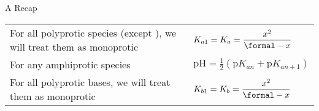 \documentclass[handout]{beamer}
\begin{document}

\begin{frame}{A Recap}
	\renewcommand\arraystretch{2}
	\begin{tabularx}{\linewidth} {@{}>{\raggedright\arraybackslash}X@{\qquad}l}
		For all polyprotic species (except \ch{H2SO4}), we will treat
		them as monoprotic & $K_{a1} = K_a =
		\dfrac{x^2}{\si{\formal}-x}$ \\
		For any amphiprotic species & $\text{pH} = \frac{1}{2}(\text{p}K_{an} +
		\text{p}K_{an+1})$\\
		For all polyprotic bases, we will treat them as monoprotic &
		$K_{b1} = K_b = \dfrac{x^2}{\si{\formal}-x}$
	\end{tabularx}
\end{frame}
\end{document}
